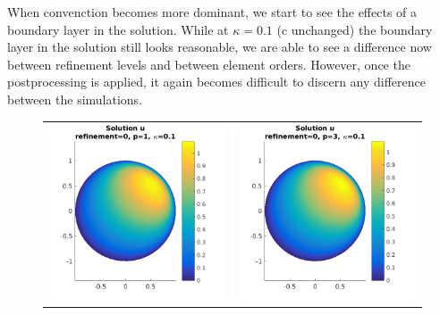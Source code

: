 \documentclass{article}
\begin{document}
When convenction becomes more dominant, we start to see the effects of a boundary layer in the solution.
While at $\kappa = 0.1$ (c unchanged) the boundary layer in the solution still looks reasonable, we are able to see a difference now between refinement levels and between element orders. However, once the postprocessing is applied, it again becomes difficult to discern any difference between the simulations.

\begin{figure}[!ht]
\centering
\begin{tabular}{c c}
\includegraphics[scale=0.7]{umu_112.png} & 
\includegraphics[scale=0.7]{umu_212.png} \\

\end{tabular}
\end{figure}
\end{document}
